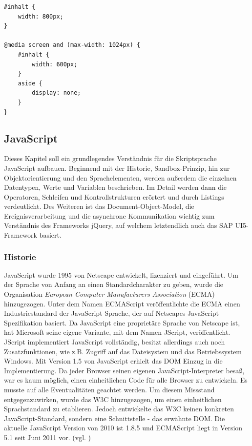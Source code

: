 \vspace{1em}
\begin{lstlisting}[language=HTML5, caption=CSS3 eigenschaftsspezifisches Stylesheet, label=lst:css3mediaquery]
#inhalt {
	width: 800px;
}
 
@media screen and (max-width: 1024px) {
	#inhalt {
		width: 600px;
	}
	aside {
		display: none;
	}
}
\end{lstlisting}

\subsection{JavaScript}
Dieses Kapitel soll ein grundlegendes Verständnis für die Skriptsprache JavaScript aufbauen. Beginnend mit der Historie, Sandbox-Prinzip, hin zur Objektorientierung und den Sprachelementen, werden außerdem die einzelnen Datentypen, Werte und Variablen beschrieben. Im Detail werden dann die Operatoren, Schleifen und Kontrollstrukturen erörtert und durch Listings verdeutlicht. Des Weiteren ist das Document-Object-Model, die Ereignisverarbeitung und die asynchrone Kommunikation wichtig zum Verständnis des Frameworks jQuery, auf welchem letztendlich auch das SAP UI5-Framework basiert.

\subsubsection{Historie} JavaScript wurde 1995 von Netscape entwickelt, lizenziert und eingeführt. Um der Sprache von Anfang an einen Standardcharakter zu geben, wurde die Organisation \textit{European Computer Manufacturers Association} (ECMA) hinzugezogen. Unter dem Namen ECMAScript veröffentlichte die ECMA einen Industriestandard der JavaScript Sprache, der auf Netscapes JavaScript Spezifikation basiert. Da JavaScript eine proprietäre Sprache von Netscape ist, hat Microsoft seine eigene Variante, mit dem Namen JScript, veröffentlicht. JScript implementiert JavaScript vollständig, besitzt allerdings auch noch Zusatzfunktionen, wie z.B. Zugriff auf das Dateisystem und das Betriebssystem Windows. Mit Version 1.5 von JavaScript erhielt das DOM Einzug in die Implementierung. Da jeder Browser seinen eigenen JavaScript-Interpreter besaß, war es kaum möglich, einen einheitlichen Code für alle Browser zu entwickeln. Es musste auf alle Eventualitäten geachtet werden. Um diesem Missstand entgegenzuwirken, wurde das W3C hinzugezogen, um einen einheitlichen Sprachstandard zu etablieren. Jedoch entwickelte das W3C keinen konkreten JavaScript-Standard, sondern eine Schnittstelle - das erwähnte DOM. Die aktuelle JavaScript Version von 2010 ist 1.8.5 und ECMAScript liegt in Version 5.1 seit Juni 2011 vor. (vgl. \cite{SelfHtml20146})

